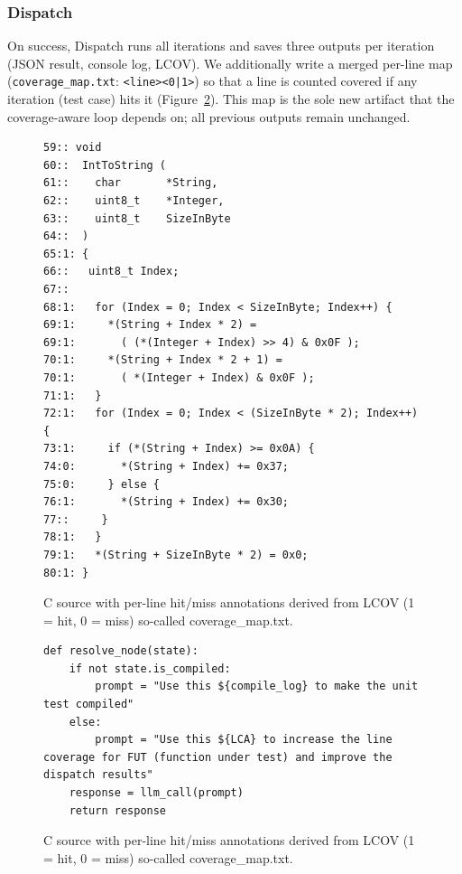 \documentclass[conference]{IEEEtran}
\begin{document}
\subsubsection*{\textbf{Dispatch}}
On success, Dispatch runs all iterations and saves three outputs per iteration (JSON result, console log, LCOV). We additionally write a merged per-line map (\texttt{coverage\_map.txt}: \texttt{<line><0|1>}) so that a line is counted covered if any iteration (test case) hits it (Figure~\ref{fig:lcov_analysis}). This map is the sole new artifact that the coverage-aware loop depends on; all previous outputs remain unchanged.

{\small
\begin{figure}[h]
  \centering
  \begin{lstlisting}[style=cstyle,
    breaklines=true,
    breakatwhitespace=false,
    columns=fullflexible,
    keepspaces=true,
    breakindent=0pt,
    postbreak=\mbox{\textcolor{gray}{$\hookrightarrow$}\space},
    basicstyle=\ttfamily\scriptsize]
59:: void
60::  IntToString (
61::    char       *String,
62::    uint8_t    *Integer,
63::    uint8_t    SizeInByte
64::  )
65:1: {
66::   uint8_t Index;
67::
68:1:   for (Index = 0; Index < SizeInByte; Index++) {
69:1:     *(String + Index * 2) =
69:1:       ( (*(Integer + Index) >> 4) & 0x0F );
70:1:     *(String + Index * 2 + 1) =
70:1:       ( *(Integer + Index) & 0x0F );
71:1:   }
72:1:   for (Index = 0; Index < (SizeInByte * 2); Index++) {
73:1:     if (*(String + Index) >= 0x0A) {
74:0:       *(String + Index) += 0x37;
75:0:     } else {
76:1:       *(String + Index) += 0x30;
77::     }
78:1:   }
79:1:   *(String + SizeInByte * 2) = 0x0;
80:1: }
  \end{lstlisting}
  \caption{C source with per-line hit/miss annotations derived from LCOV (1 = hit, 0 = miss) so-called coverage\_map.txt.}
  \label{fig:lcov_analysis}
\end{figure}
}

{\small
\begin{figure}[h]
  \centering
  \begin{lstlisting}[style=cstyle,
    breaklines=true,
    breakatwhitespace=false,
    columns=fullflexible,
    keepspaces=true,
    breakindent=0pt,
    postbreak=\mbox{\textcolor{gray}{$\hookrightarrow$}\space},
    basicstyle=\ttfamily\scriptsize]
def resolve_node(state):
    if not state.is_compiled:
        prompt = "Use this ${compile_log} to make the unit test compiled"
    else:
        prompt = "Use this ${LCA} to increase the line coverage for FUT (function under test) and improve the dispatch results"
    response = llm_call(prompt)
    return response
  \end{lstlisting}
  \caption{C source with per-line hit/miss annotations derived from LCOV (1 = hit, 0 = miss) so-called coverage\_map.txt.}
  \label{fig:lcov_analysis}
\end{figure}
}
\end{document}
